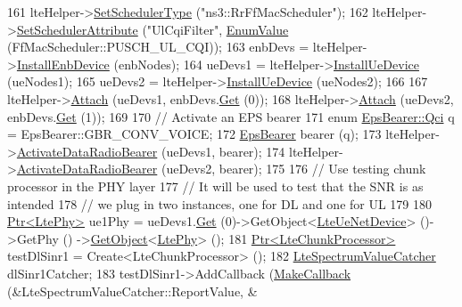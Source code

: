 \begin{DoxyCode}
161   lteHelper->\hyperlink{classns3_1_1LteHelper_a8f86e55b8b80a81732c4b2df00fb25d5}{SetSchedulerType} (\textcolor{stringliteral}{"ns3::RrFfMacScheduler"});
162   lteHelper->\hyperlink{classns3_1_1LteHelper_a38f8c7f4592b31c0f3dedb53e7909742}{SetSchedulerAttribute} (\textcolor{stringliteral}{"UlCqiFilter"}, 
      \hyperlink{classns3_1_1EnumValue}{EnumValue} (FfMacScheduler::PUSCH\_UL\_CQI));
163   enbDevs = lteHelper->\hyperlink{classns3_1_1LteHelper_a5e009ad35ef85f46b5a6099263f15a03}{InstallEnbDevice} (enbNodes);
164   ueDevs1 = lteHelper->\hyperlink{classns3_1_1LteHelper_ac9cd932d7de92811cfa953c2e3b2fc9f}{InstallUeDevice} (ueNodes1);
165   ueDevs2 = lteHelper->\hyperlink{classns3_1_1LteHelper_ac9cd932d7de92811cfa953c2e3b2fc9f}{InstallUeDevice} (ueNodes2);
166 
167   lteHelper->\hyperlink{classns3_1_1LteHelper_a9466743f826aa2652a87907b7f0a1c87}{Attach} (ueDevs1, enbDevs.\hyperlink{classns3_1_1NetDeviceContainer_a677d62594b5c9d2dea155cc5045f4d0b}{Get} (0));
168   lteHelper->\hyperlink{classns3_1_1LteHelper_a9466743f826aa2652a87907b7f0a1c87}{Attach} (ueDevs2, enbDevs.\hyperlink{classns3_1_1NetDeviceContainer_a677d62594b5c9d2dea155cc5045f4d0b}{Get} (1));
169 
170   \textcolor{comment}{// Activate an EPS bearer}
171   \textcolor{keyword}{enum} \hyperlink{structns3_1_1EpsBearer_aecf0c67109c5eb4ec0b07226fff5885e}{EpsBearer::Qci} q = EpsBearer::GBR\_CONV\_VOICE;
172   \hyperlink{structns3_1_1EpsBearer}{EpsBearer} bearer (q);
173   lteHelper->\hyperlink{classns3_1_1LteHelper_ac896e16cf162e4beeaa292d39ab1b700}{ActivateDataRadioBearer} (ueDevs1, bearer);
174   lteHelper->\hyperlink{classns3_1_1LteHelper_ac896e16cf162e4beeaa292d39ab1b700}{ActivateDataRadioBearer} (ueDevs2, bearer);
175 
176   \textcolor{comment}{// Use testing chunk processor in the PHY layer}
177   \textcolor{comment}{// It will be used to test that the SNR is as intended}
178   \textcolor{comment}{// we plug in two instances, one for DL and one for UL}
179 
180   \hyperlink{classns3_1_1Ptr}{Ptr<LtePhy>} ue1Phy = ueDevs1.\hyperlink{classns3_1_1NetDeviceContainer_a677d62594b5c9d2dea155cc5045f4d0b}{Get} (0)->GetObject<\hyperlink{classns3_1_1LteUeNetDevice}{LteUeNetDevice}> ()->GetPhy ()
      ->\hyperlink{classns3_1_1Object_a13e18c00017096c8381eb651d5bd0783}{GetObject}<\hyperlink{classns3_1_1LtePhy}{LtePhy}> ();
181   \hyperlink{classns3_1_1Ptr}{Ptr<LteChunkProcessor>} testDlSinr1 = Create<LteChunkProcessor> ();
182   \hyperlink{classns3_1_1LteSpectrumValueCatcher}{LteSpectrumValueCatcher} dlSinr1Catcher;
183   testDlSinr1->AddCallback (\hyperlink{group__makecallbackmemptr_ga9376283685aa99d204048d6a4b7610a4}{MakeCallback} (&LteSpectrumValueCatcher::ReportValue, &

\end{DoxyCode}
